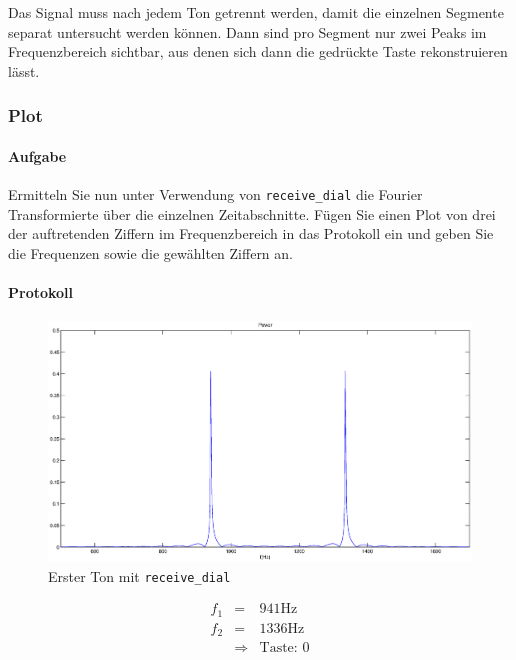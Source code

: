 \documentclass[10pt]{report}
\begin{document}
        Das Signal muss nach jedem Ton getrennt werden, damit die einzelnen Segmente
        separat untersucht werden können. Dann sind pro Segment nur zwei Peaks im
        Frequenzbereich sichtbar, aus denen sich dann die gedrückte Taste rekonstruieren
        lässt.

        \subsubsection{Plot}
        \paragraph{Aufgabe}
        Ermitteln Sie nun unter Verwendung von \texttt{receive\_dial} die Fourier Transformierte
        über die einzelnen Zeitabschnitte. Fügen Sie einen Plot von drei der auftretenden
        Ziffern im Frequenzbereich in das Protokoll ein und geben Sie die Frequenzen sowie
        die gewählten Ziffern an.

        \paragraph{Protokoll}
        \begin{center}
            \begin{figure}[H]
                \includegraphics[width=\textwidth]{img43541}
                \caption{Erster Ton mit \texttt{receive\_dial}}
            \end{figure}
        \end{center}
        \begin{eqnarray*}
            f_1 &=& 941 \si{\hertz}\\
            f_2 &=& 1336 \si{\hertz}\\
            &\Rightarrow& \text{Taste: }0
        \end{eqnarray*}
\end{document}
